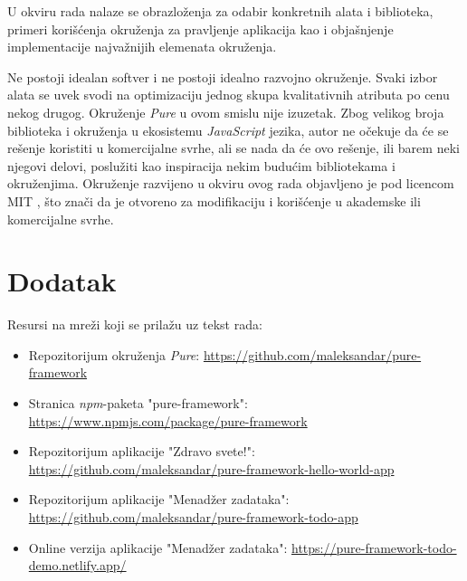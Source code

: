 \documentclass[12pt,oneside]{memoir}
\begin{document}
U okviru rada nalaze se obrazloženja za odabir konkretnih alata i biblioteka, primeri korišćenja okruženja za pravljenje aplikacija kao i objašnjenje implementacije najvažnijih elemenata okruženja.

Ne postoji idealan softver i ne postoji idealno razvojno okruženje. Svaki izbor alata se uvek svodi na optimizaciju jednog skupa kvalitativnih atributa po cenu nekog drugog. Okruženje \emph{Pure} u ovom smislu nije izuzetak.
Zbog velikog broja biblioteka i okruženja u ekosistemu \emph{JavaScript} jezika, autor ne očekuje da će se rešenje koristiti u komercijalne svrhe,
ali se nada da će ovo rešenje, ili barem neki njegovi delovi, poslužiti kao inspiracija nekim budućim bibliotekama i okruženjima.
Okruženje razvijeno u okviru ovog rada objavljeno je pod licencom MIT \cite{MIT}, što znači da je otvoreno za modifikaciju i korišćenje u akademske ili komercijalne svrhe.


\chapter{Dodatak}
Resursi na mreži koji se prilažu uz tekst rada:
\begin{itemize}
  \item Repozitorijum okruženja \emph{Pure}: \url{https://github.com/maleksandar/pure-framework}
  \item Stranica \emph{npm}-paketa "pure-framework": \url{https://www.npmjs.com/package/pure-framework}
  \item Repozitorijum aplikacije "Zdravo svete!": \url{https://github.com/maleksandar/pure-framework-hello-world-app}
  \item Repozitorijum aplikacije "Menadžer zadataka": \url{https://github.com/maleksandar/pure-framework-todo-app}
  \item Online verzija aplikacije "Menadžer zadataka": \url{https://pure-framework-todo-demo.netlify.app/}
\end{itemize}
\literatura
\end{document}
